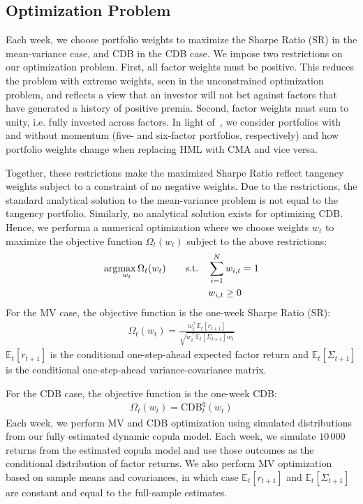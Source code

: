 
\subsection{Optimization Problem} %
\label{sub:optimization_problem}

Each week, we choose portfolio weights to maximize the Sharpe Ratio (SR) in the mean-variance case, and CDB in the CDB case. We impose two restrictions on our optimization problem. First, all factor weights must be positive. This reduces the problem with extreme weights, seen in the unconstrained optimization problem, and reflects a view that an investor will not bet against factors that have generated a history of positive premia. Second, factor weights must sum to unity, i.e. fully invested across factors. In light of~\textcite{Asness2015}, we consider portfolios with and without momentum (five- and six-factor portfolios, respectively) and how portfolio weights change when replacing HML with CMA and vice versa.

Together, these restrictions make the maximized Sharpe Ratio reflect tangency weights subject to a constraint of no negative weights. Due to the restrictions, the standard analytical solution to the mean-variance problem is not equal to the tangency portfolio. Similarly, no analytical solution exists for optimizing CDB. Hence, we performa a numerical optimization where we choose weights $w_t$ to maximize the objective function $\Omega_t(w_t)$ subject to the above restrictions:
\begin{align}
  \arg\!\max_{w_t} \Omega_t(w_t)
    &&\text{\quad s.t.\quad} & \sum_{i=1}^N w_{i,t} = 1 \\
    &&                       & w_{i,t} \ge 0 \notag
\end{align}
For the MV case, the objective function is the one-week Sharpe Ratio (SR):
\begin{align}
  \Omega_t(w_t) = \frac{w_t^\top \mathbb{E}_t[r_{t+1}]}{\sqrt{w_t^\top \mathbb{E}_t[\Sigma_{t+1}] w_t}}
\end{align}
$\mathbb{E}_t[r_{t+1}]$ is the conditional one-step-ahead expected factor return and $\mathbb{E}_t[\Sigma_{t+1}]$ is the conditional one-step-ahead variance-covariance matrix. 

For the CDB case, the objective function is the one-week CDB:
\begin{align}
  \Omega_t(w_t) = \text{CDB}_t^q(w_t)
\end{align}
Each week, we perform MV and CDB optimization using simulated distributions from our fully estimated dynamic copula model. Each week, we simulate $10\,000$ returns from the estimated copula model and use those outcomes as the conditional distribution of factor returns. We also perform MV optimization based on sample means and covariances, in which case $\mathbb{E}_t[r_{t+1}]$ and $\mathbb{E}_t[\Sigma_{t+1}]$ are constant and equal to the full-sample estimates.


